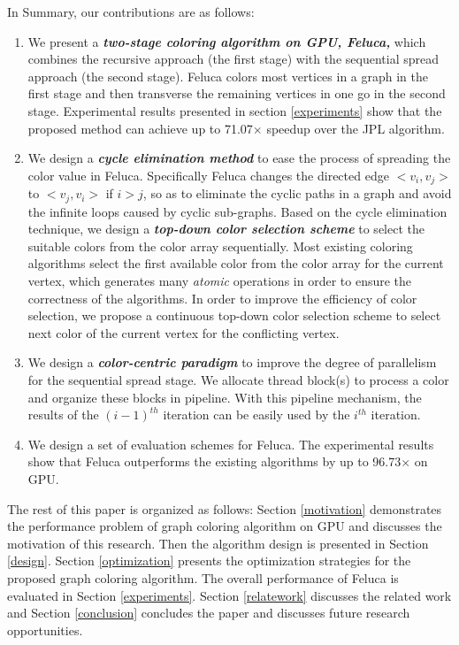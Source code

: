 In Summary, our contributions are as follows:
\begin{enumerate}
	\item We present a \textbf{\emph{two-stage coloring algorithm on GPU, Feluca,}} 
	which combines
	the recursive approach (the first stage) with the sequential spread approach (the second stage). 
	Feluca colors most vertices in a graph in the first stage and then transverse the remaining vertices in one go in the second stage.
	Experimental results presented in section \ref{experiments} 
	show that the proposed method can achieve up to 71.07$\times$ speedup over the JPL algorithm.
	\item We design a \textbf{\emph{cycle elimination method}} to ease the process of spreading the color value in Feluca. Specifically Feluca changes the directed edge $<v_i, v_j>$ to $<v_j, v_i>$ if $i>j$, so as to 
	eliminate the cyclic paths in a graph and avoid the infinite loops caused by cyclic sub-graphs. Based on the cycle elimination technique, we design a 
	\textbf{\emph{top-down color selection scheme}} to select the 
	suitable colors from the color array sequentially. Most existing coloring algorithms select the first available color from the color array for the current vertex, which generates many 
	\emph{atomic} operations in order to ensure the correctness of the algorithms. In 
	order to improve the efficiency of color selection, we propose a continuous top-down color 
	selection scheme to select next color of the current vertex for the conflicting vertex.
	\item We design a \textbf{\emph{color-centric paradigm}} to improve the degree of parallelism 
	for the sequential spread stage. We allocate thread block(s) to process a color and organize these blocks in pipeline. 
	With this pipeline mechanism, the results of the  $(i - 1)^{th}$ iteration can be easily used by the $i^{th}$ iteration.
	\item We design a set of evaluation schemes for Feluca. The experimental results show that Feluca outperforms the existing algorithms by up to 96.73$\times$ on GPU.	
\end{enumerate}
The rest of this paper is organized as follows: Section \ref{motivation} demonstrates the performance 
problem of graph coloring algorithm on GPU and  discusses the motivation of this research. Then the 
algorithm design is presented in Section \ref{design}. Section \ref{optimization} presents the 
optimization strategies for the proposed graph coloring algorithm. The overall performance of 
Feluca is evaluated in Section \ref{experiments}. Section \ref{relatework} discusses the related work 
and Section \ref{conclusion} concludes the paper and discusses future research opportunities.